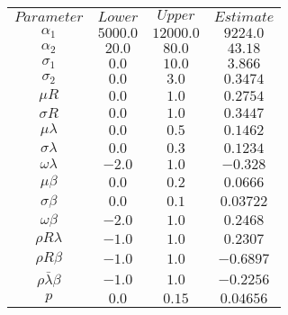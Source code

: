 \begin{tabular}{cccc}
$Parameter$ & $Lower$ & $Upper$ & $Estimate$\\
$\alpha{_1}$ & $5000.0$ & $12000.0$ & $9224.0$\\
$\alpha{_2}$ & $20.0$ & $80.0$ & $43.18$\\
$\sigma{_1}$ & $0.0$ & $10.0$ & $3.866$\\
$\sigma{_2}$ & $0.0$ & $3.0$ & $0.3474$\\
${\mu}R$ & $0.0$ & $1.0$ & $0.2754$\\
${\sigma}R$ & $0.0$ & $1.0$ & $0.3447$\\
$\mu\lambda$ & $0.0$ & $0.5$ & $0.1462$\\
$\sigma\lambda$ & $0.0$ & $0.3$ & $0.1234$\\
$\omega\lambda$ & $-2.0$ & $1.0$ & $-0.328$\\
$\mu\beta$ & $0.0$ & $0.2$ & $0.0666$\\
$\sigma\beta$ & $0.0$ & $0.1$ & $0.03722$\\
$\omega\beta$ & $-2.0$ & $1.0$ & $0.2468$\\
${\rho}R\lambda$ & $-1.0$ & $1.0$ & $0.2307$\\
${\rho}R\beta$ & $-1.0$ & $1.0$ & $-0.6897$\\
$\rho\bar\lambda\beta$ & $-1.0$ & $1.0$ & $-0.2256$\\
$p$ & $0.0$ & $0.15$ & $0.04656$\\
\end{tabular}

